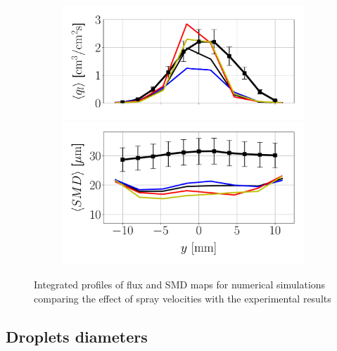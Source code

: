\begin{figure}[h!]
\begin{subfigure}[b]{0.4\textwidth}
	\flushleft
   \includegraphics[scale=0.35]{./part2_developments/figures_ch6_lagrangian_JICF/params_spray_velocities/profiles/flux_along_y}\\
   \vspace{-0.16in}
   \includegraphics[scale=0.35]{./part2_developments/figures_ch6_lagrangian_JICF/params_spray_velocities/profiles/SMD_along_y}
\end{subfigure}

\caption{Integrated profiles of flux and SMD maps for numerical simulations comparing the effect of spray velocities with the experimental results}
\label{fig:profiles_LGS_JICF_spray_velocities}
\end{figure}

\clearpage

\subsection{Droplets diameters}

